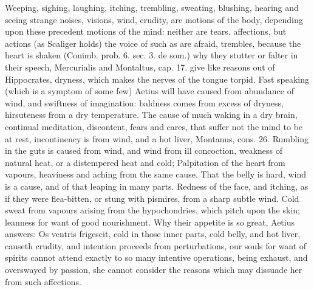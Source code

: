 {Weeping, sighing, laughing, itching, trembling, sweating, blushing,
hearing and seeing strange noises, visions, wind, crudity, are motions
of the body, depending upon these precedent motions of the mind:
neither are tears, affections, but actions (as Scaliger holds)
the voice of such as are afraid, trembles, because the heart is
shaken (Conimb. prob. 6. sec. 3. de som.) why they stutter or falter in
their speech, Mercurialis and Montaltus, cap. 17. give like reasons out
of Hippocrates, dryness, which makes the nerves of the tongue
torpid. Fast speaking (which is a symptom of some few) Aetius will have
caused  from abundance of wind, and swiftness of imagination:
baldness comes from excess of dryness, hirsuteness from a dry
temperature. The cause of much waking in a dry brain, continual
meditation, discontent, fears and cares, that suffer not the mind to be
at rest, incontinency is from wind, and a hot liver, Montanus, cons.
26. Rumbling in the guts is caused from wind, and wind from ill
concoction, weakness of natural heat, or a distempered heat and cold;
Palpitation of the heart from vapours, heaviness and aching from
the same cause. That the belly is hard, wind is a cause, and of that
leaping in many parts. Redness of the face, and itching, as if they
were flea-bitten, or stung with pismires, from a sharp subtle wind.
Cold sweat from vapours arising from the hypochondries, which
pitch upon the skin; leanness for want of good nourishment. Why their
appetite is so great, Aetius answers: Os ventris frigescit, cold
in those inner parts, cold belly, and hot liver, causeth crudity, and
intention proceeds from perturbations, our souls for want of
spirits cannot attend exactly to so many intentive operations, being
exhaust, and overswayed by passion, she cannot consider the reasons
which may dissuade her from such affections.

}
